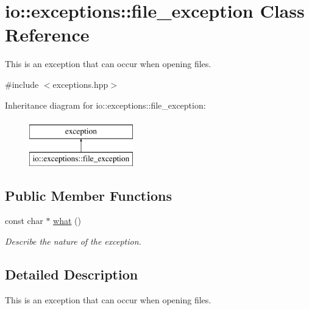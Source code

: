 \hypertarget{classio_1_1exceptions_1_1file__exception}{\section{io\-:\-:exceptions\-:\-:file\-\_\-exception Class Reference}
\label{classio_1_1exceptions_1_1file__exception}
}


This is an exception that can occur when opening files.  




{\ttfamily \#include $<$exceptions.\-hpp$>$}

Inheritance diagram for io\-:\-:exceptions\-:\-:file\-\_\-exception\-:\begin{figure}[H]
\begin{center}
\leavevmode
\includegraphics[height=2.000000cm]{classio_1_1exceptions_1_1file__exception}
\end{center}
\end{figure}
\subsection*{Public Member Functions}
\begin{DoxyCompactItemize}
\item 
const char $\ast$ \hyperlink{classio_1_1exceptions_1_1file__exception_ad9313788b0771722c6e2e51ac1ec8a8d}{what} ()
\begin{DoxyCompactList}\small\item\em Describe the nature of the exception. \end{DoxyCompactList}\end{DoxyCompactItemize}


\subsection{Detailed Description}
This is an exception that can occur when opening files. 



 

